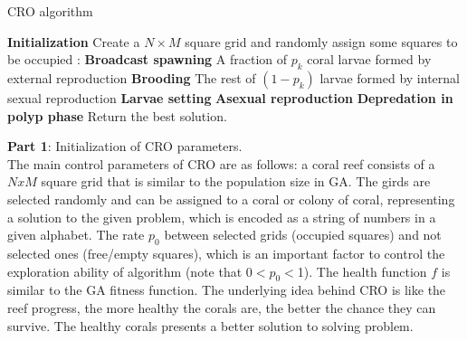 \documentclass[review,3p,authoryear]{elsarticle}
\begin{document}
\begin{algorithm}
\caption{CRO algorithm}\label{algo_CRO}
\begin{algorithmic}[1]
   \State \textbf{Initialization} \newline
   \hspace*{\algorithmicindent}Create a $N \times M$ square grid and randomly assign some squares to be occupied
   :
   \State \textbf{Broadcast spawning} \newline
   \hspace*{\algorithmicindent} \hspace*{\algorithmicindent} A fraction of $p_{k}$ coral larvae formed by external reproduction
   \State \textbf{Brooding} \newline
   \hspace*{\algorithmicindent} \hspace*{\algorithmicindent} The rest of $(1 - p_{k})$ larvae formed by internal sexual reproduction
   \State \textbf{Larvae setting} %
   \State \textbf{Asexual reproduction} %
	\State \textbf{Depredation in polyp phase} 
   \EndWhile
   \State Return the best solution.           
\end{algorithmic}
\end{algorithm}

\textbf{Part 1}: Initialization of CRO parameters.\\
	\indent The main control parameters of CRO are as follows: a coral reef consists of a $NxM$ square grid that is similar to the population size in GA. The girds are selected randomly and can be assigned to a coral or colony of coral, representing a solution to the given problem, which is encoded as a string of numbers in a given alphabet. The rate $p_{0}$ between selected grids (occupied squares) and not selected ones (free/empty squares), which is an important factor to control the exploration ability of algorithm (note that 0$<p_{0}<$1). The health function $f$ is similar to the GA fitness function. The underlying idea behind CRO is like the reef progress, the more healthy the corals are, the better the chance they can survive. The healthy corals presents a better solution to solving problem.
\end{document}
